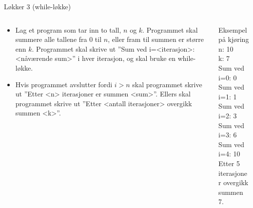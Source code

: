 \documentclass[screen, aspectratio=169]{beamer}
\begin{document}
\begin{frame}{Løkker 3 (while-løkke)}
	\begin{columns}
		\begin{column}{.7\textwidth}
			\begin{itemize}
				\item Lag et program som tar inn to tall, $n$ og $k$. Programmet skal summere alle tallene fra 0 til $n$, eller fram til summen er større enn $k$. Programmet skal skrive ut ''Sum ved i=<iterasjon>: <nåværende sum>'' i hver iterasjon, og skal bruke en while-løkke.
				\item Hvis programmet avslutter fordi $i>n$ skal programmet skrive ut ''Etter <n> iterasjoner er summen <sum>''. Ellers skal programmet skrive ut ''Etter <antall iterasjoner> overgikk summen <k>''.
			\end{itemize}
		\end{column}
		\begin{column}{.3\textwidth}
			\begin{exampleblock}{Eksempel på kjøring}
				n: \textcolor{input-color}{10}\\
				k: \textcolor{input-color}{7}\\
				Sum ved i=0: 0\\
				Sum ved i=1: 1\\
				Sum ved i=2: 3\\
				Sum ved i=3: 6\\
				Sum ved i=4: 10\\
				Etter 5 iterasjoner overgikk summen 7.
			\end{exampleblock}
		\end{column}
	\end{columns}
\end{frame}
\end{document}
